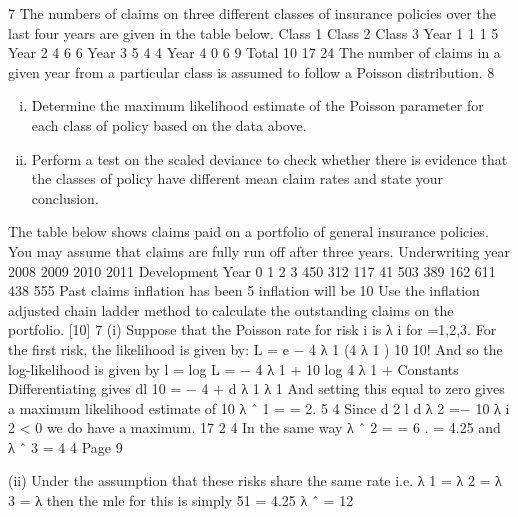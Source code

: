 \documentclass[a4paper,12pt]{article}
\begin{document}
\begin{enumerate}
7
The numbers of claims on three different classes of insurance policies over the last
four years are given in the table below.
Class 1
Class 2
Class 3
Year 1
1
1
5
Year 2
4
6
6
Year 3
5
4
4
Year 4
0
6
9
Total
10
17
24
The number of claims in a given year from a particular class is assumed to follow a
Poisson distribution.
8

\begin{enumerate}[(i)]
\item Determine the maximum likelihood estimate of the Poisson parameter for each class of policy based on the data above.
\item Perform a test on the scaled deviance to check whether there is evidence that the classes of policy have different mean claim rates and state your
conclusion.
\end{enumerate}


The table below shows claims paid on a portfolio of general insurance policies. You
may assume that claims are fully run off after three years.
Underwriting year
2008
2009
2010
2011
Development Year
0
1
2
3
450 312 117 41
503 389 162
611 438
555
Past claims inflation has been 5%
inflation will be 10%
Use the inflation adjusted chain ladder method to calculate the outstanding claims on
the portfolio.
[10]
7
(i)
Suppose that the Poisson rate for risk i is λ i for =1,2,3.
For the first risk, the likelihood is given by:
L = e − 4 λ 1
(4 λ 1 ) 10
10!
And so the log-likelihood is given by
l = log L = − 4 λ 1 + 10 log 4 λ 1 + Constants
Differentiating gives
dl
10
= − 4 +
d λ 1
λ 1
And setting this equal to zero gives a maximum likelihood estimate of
10
λ ˆ 1 =
= 2. 5
4
Since
d 2 l
d λ
2
=−
10
λ i 2
< 0 we do have a maximum.
17
2 4
In the same way λ ˆ 2 =
= 6 .
= 4.25 and λ ˆ 3 =
4
4
Page 9

(ii)
Under the assumption that these risks share the same rate i.e. λ 1 = λ 2 = λ 3 = λ
then the mle for this is simply
51
= 4.25
λ ˆ =
12


\end{enumerate}
\end{document}
